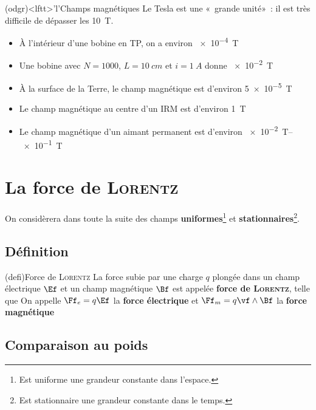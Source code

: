 \documentclass[../../main/main.tex]{subfiles}
\begin{document}
\begin{tcb*}(odgr)<lftt>'l'{Champs magnétiques}
	Le Tesla est une «~grande unité»~: il est très difficile de dépasser les
	\SI{10}{T}.
	\begin{itemize}[label=$\diamond$]
		\item À l'intérieur d'une bobine en TP, on a environ
		      \SI{e-4}{T}
		\item Une bobine avec $N = \num{1000}$, $L = \SI{10}{cm}$ et $i =
			      \SI{1}{A}$ donne \SI{e-2}{T}
		\item À la surface de la Terre, le champ magnétique est d'environ
		      \SI{5e-5}{T}
		\item Le champ magnétique au centre d'un IRM est d'environ
		      \SI{1}{T}
		\item Le champ magnétique d'un aimant permanent est d'environ
		      \SIrange{e-2}{e-1}{T}
	\end{itemize}
\end{tcb*}

\vspace{-12pt}
\section{La force de \textsc{Lorentz}}
On considèrera dans toute la suite des champs \textbf{uniformes}\footnote{Est
	uniforme une grandeur constante dans l'espace.} et
\textbf{stationnaires}\footnote{Est stationnaire une grandeur constante dans le
	temps.}.
\vspace{-12pt}

\subsection{Définition}
\begin{tcb*}(defi){Force de \textsc{Lorentz}}
	La force subie par une charge $q$ plongée dans un champ électrique $\Ef$ et
	un champ magnétique $\Bf$ est appelée \textbf{force de \textsc{Lorentz}},
	telle que
	\psw{
		\[\boxed{\Ff = q\left(\Ef + \vf \wedge \Bf\right)}\]
	}
	On appelle $\Ff_e = q\Ef$ la \textbf{force électrique} et $\Ff_m =
		q\vf\wedge\Bf$ la \textbf{force magnétique}
\end{tcb*}

\subsection{Comparaison au poids}
\end{document}
